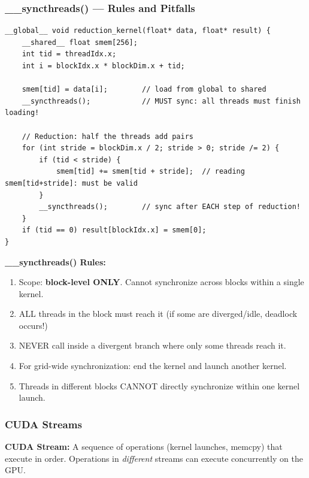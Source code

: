 \documentclass[11pt,a4paper]{article}
\begin{document}
\subsubsection{\_\_syncthreads() --- Rules and Pitfalls}

\begin{lstlisting}
__global__ void reduction_kernel(float* data, float* result) {
    __shared__ float smem[256];
    int tid = threadIdx.x;
    int i = blockIdx.x * blockDim.x + tid;

    smem[tid] = data[i];        // load from global to shared
    __syncthreads();            // MUST sync: all threads must finish loading!

    // Reduction: half the threads add pairs
    for (int stride = blockDim.x / 2; stride > 0; stride /= 2) {
        if (tid < stride) {
            smem[tid] += smem[tid + stride];  // reading smem[tid+stride]: must be valid
        }
        __syncthreads();        // sync after EACH step of reduction!
    }
    if (tid == 0) result[blockIdx.x] = smem[0];
}
\end{lstlisting}

\begin{important}
\textbf{\_\_syncthreads() Rules:}
\begin{enumerate}[noitemsep]
  \item Scope: \textbf{block-level ONLY}. Cannot synchronize across blocks within a single kernel.
  \item ALL threads in the block must reach it (if some are diverged/idle, deadlock occurs!)
  \item NEVER call inside a divergent branch where only some threads reach it.
  \item For grid-wide synchronization: end the kernel and launch another kernel.
  \item Threads in different blocks CANNOT directly synchronize within one kernel launch.
\end{enumerate}
\end{important}

\subsubsection{CUDA Streams}

\begin{mydef}
\textbf{CUDA Stream:} A sequence of operations (kernel launches, memcpy) that execute in order. Operations in \textit{different} streams can execute concurrently on the GPU.
\end{mydef}
\end{document}
